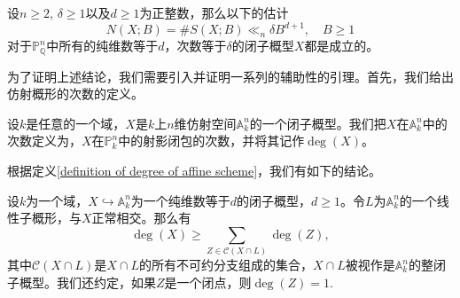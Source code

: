 \begin{theorem} \label{refined Schanuel estimate for rational points}
设$n \geqslant 2$, $\delta \geqslant 1$以及$d \geqslant 1$为正整数，那么以下的估计
\begin{equation}
N(X;B) = \#S(X;B) \ll_{n} \delta B^{d+1}, \quad B \geqslant 1
\end{equation}
对于$\mathbb{P}^n_{\mathbb{Q}}$中所有的纯维数等于$d$，次数等于$\delta$的闭子概型$X$都是成立的。
\end{theorem}

为了证明上述结论，我们需要引入并证明一系列的辅助性的引理。首先，我们给出仿射概形的次数的定义。
\begin{definition} \label{definition of degree of affine scheme}
设$k$是任意的一个域，$X$是$k$上$n$维仿射空间$\mathbb{A}^n_k$的一个闭子概型。我们把$X$在$\mathbb{A}^n_k$中的次数定义为，$X$在$\mathbb{P}^n_k$中的射影闭包的次数，并将其记作$\deg(X)$。
\end{definition}

根据定义\ref{definition of degree of affine scheme}，我们有如下的结论。

\begin{lemma} \label{degree of affine variety}
设$k$为一个域，$X \hookrightarrow \mathbb{A}_k^n$为一个纯维数等于$d$的闭子概型，$d \geqslant 1$。令$L$为$\mathbb{A}_k^n$的一个线性子概形，与$X$正常相交。那么有
\begin{equation}
\deg(X) \geqslant \sum_{Z\in\mathcal{C}(X\cap L)} \deg(Z),
\end{equation}
其中$\mathcal{C}(X\cap L)$是$X\cap L$的所有不可约分支组成的集合，$X\cap L$被视作是$\mathbb{A}^n_k$的整闭子概型。我们还约定，如果$Z$是一个闭点，则$\deg(Z) = 1.$
\end{lemma}

